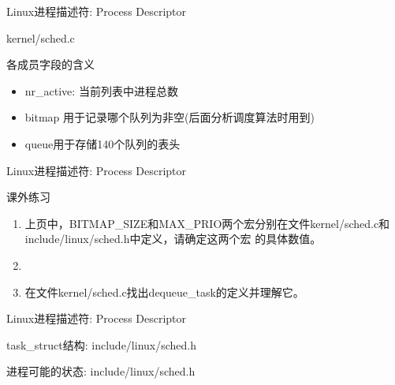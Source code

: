 \documentclass[xcolor=svgnames]{beamer}
\begin{document}
\begin{CJK*}{UTF8}{gbsn}
\begin{frame}{Linux进程描述符: Process Descriptor}
\begin{block}{kernel/sched.c}
\lstprio
\end{block}
\begin{block}{各成员字段的含义}
\begin{itemize}
\item nr\_active: 当前列表中进程总数
\item bitmap 用于记录哪个队列为非空(后面分析调度算法时用到)
\item queue用于存储140个队列的表头
\end{itemize}
\end{block}
\end{frame}

\begin{frame}{Linux进程描述符: Process Descriptor}
\lstenqueue
\end{frame}


\begin{frame}{课外练习}
\begin{enumerate}
\item 上页中，\alert{BITMAP\_SIZE}和\alert{MAX\_PRIO}两个宏分别在文件kernel/sched.c和include/linux/sched.h中定义，请确定这两个宏
的具体数值。
\item[]
\item 在文件kernel/sched.c找出dequeue\_task的定义并理解它。
\end{enumerate}
\end{frame}

\begin{frame}{Linux进程描述符: Process Descriptor}
\begin{block}{task\_struct结构: include/linux/sched.h}
\lstPCBstate
\end{block}
\begin{block}{进程可能的状态: include/linux/sched.h}
\lststates
\end{block}
\end{frame}


\end{CJK*}
\end{document}
